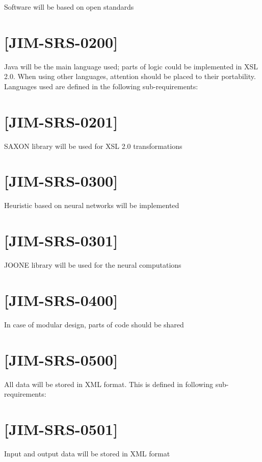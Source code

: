 \documentclass[10pt,oneside]{memoir}
\begin{document}
Software will be based on open standards


\section{[JIM-SRS-0200]}
\label{jim-srs-0200}

Java will be the main language used; parts of logic could be implemented in XSL 2.0. When using other languages, attention should be placed to their portability. Languages used are defined in the following sub-requirements:


\section{[JIM-SRS-0201]}
\label{jim-srs-0201}

SAXON library will be used for XSL 2.0 transformations


\section{[JIM-SRS-0300]}
\label{jim-srs-0300}

Heuristic based on neural networks will be implemented


\section{[JIM-SRS-0301]}
\label{jim-srs-0301}

JOONE library will be used for the neural computations


\section{[JIM-SRS-0400]}
\label{jim-srs-0400}

In case of modular design, parts of code should be shared


\section{[JIM-SRS-0500]}
\label{jim-srs-0500}

All data will be stored in XML format. This is defined in following sub-requirements:


\section{[JIM-SRS-0501]}
\label{jim-srs-0501}

Input and output data will be stored in XML format
\end{document}
